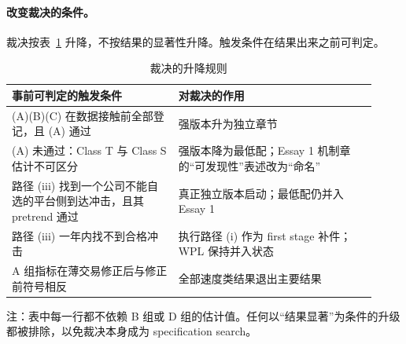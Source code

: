 \documentclass[a4paper,11pt]{ctexart}
\begin{document}
\paragraph{改变裁决的条件。}
裁决按表~\ref{tab:13-decision-rule} 升降，不按结果的显著性升降。触发条件在结果出来之前可判定。

\begin{table}[htbp]
\centering
\caption{裁决的升降规则}
\label{tab:13-decision-rule}
\begin{threeparttable}
\begin{tabular}{@{}p{0.42\linewidth}p{0.5\linewidth}@{}}
\toprule
事前可判定的触发条件 & 对裁决的作用 \\
\midrule
(A)(B)(C) 在数据接触前全部登记，且 (A) 通过 & 强版本升为独立章节 \\
(A) 未通过：Class T 与 Class S 估计不可区分 & 强版本降为最低配；Essay 1 机制章的“可发现性”表述改为“命名” \\
路径 (iii) 找到一个公司不能自选的平台侧到达冲击，且其 pretrend 通过 & 真正独立版本启动；最低配仍并入 Essay 1 \\
路径 (iii) 一年内找不到合格冲击 & 执行路径 (i) 作为 first stage 补件；WPL 保持并入状态 \\
A 组指标在薄交易修正后与修正前符号相反 & 全部速度类结果退出主要结果 \\
\bottomrule
\end{tabular}
\begin{tablenotes}\footnotesize
\item 注：表中每一行都不依赖 B 组或 D 组的估计值。任何以“结果显著”为条件的升级都被排除，以免裁决本身成为 specification search。
\end{tablenotes}
\end{threeparttable}
\end{table}
\end{document}
